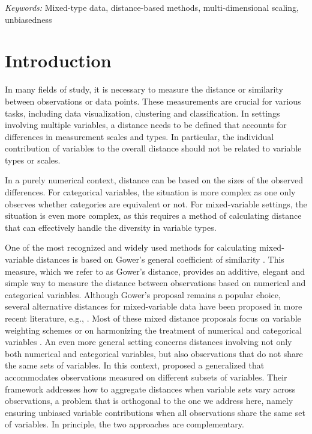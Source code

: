 \documentclass[12pt]{article}
\begin{document}
\noindent%
{\it Keywords:} Mixed-type data, distance-based methods, multi-dimensional scaling, unbiasedness
\vfill

\newpage
{}
\section{Introduction}
In many fields of study, it is necessary to measure the distance or similarity between observations or data points. These measurements are crucial for various tasks, including data visualization, clustering and classification. In settings involving multiple variables, a distance needs to be defined that accounts for differences in measurement scales and types. In particular, the individual contribution of variables to the overall distance should not be related to variable types or scales.

In a purely numerical context, distance can be based on the sizes of the observed differences. For categorical variables, the situation is more complex as one only observes whether categories are equivalent or not. For mixed-variable settings, the situation is even more complex, as this requires a method of calculating distance that can effectively handle the diversity in variable types.

One of the most recognized and widely used methods for calculating mixed-variable distances is based on Gower’s general coefficient of similarity \parencite{Gower:1971}. This measure, which we refer to as Gower's distance, provides an additive, elegant and simple way to measure the distance between observations based on numerical and categorical variables. Although Gower's proposal remains a popular choice, several alternative distances for mixed-variable data have been proposed in more recent literature, e.g., \textcite{MS:2023,GT:2024,BojGrane:2024}. Most of these mixed distance proposals focus on variable weighting schemes \parencite{AD:2007,HennigLiao2013,MS:2023,GT:2024} or on harmonizing the treatment of numerical and categorical variables \parencite{Huang1998,foss2016semiparametric, de2021towards}. An even more general setting concerns distances involving not only both numerical and categorical variables, but also observations that do not share the same sets of variables. In this context, \textcite{halle2025distance} proposed a generalized  that accommodates observations measured on different subsets of variables. Their framework addresses how to aggregate distances when variable sets vary across observations, a problem that is orthogonal to the one we address here, namely ensuring unbiased variable contributions when all observations share the same set of variables. In principle, the two approaches are complementary.
\end{document}
